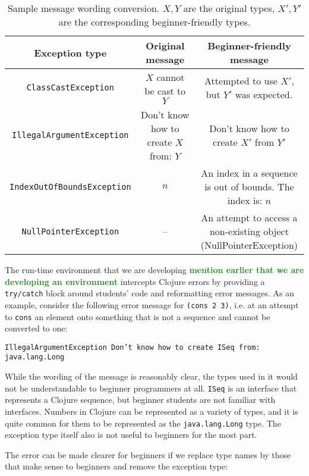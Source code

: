 \documentclass[submission,copyright,creativecommons]{eptcs}
\newcommand{\allcomments}[1]{{#1}}
\newcommand{\elenacomment}[1]{{\bf \textcolor{ForestGreen}{\allcomments{{#1}}}}}
\begin{document}
 \begin{table}
\begin{tabular}{|c|c|c|}
\hline
Exception type & Original message & Beginner-friendly message \\
\hline 
{\tt ClassCastException} & $X$ cannot be cast to $Y$ & {\parbox{5cm}{Attempted to use $X'$, \\ 
but $Y'$ was expected.}} \\[0.3cm]
\hline
{\tt IllegalArgumentException} & 
Don't know how to create $X$ from:  $Y$ & 
{\parbox{5cm}{Don't know how to \\ create  $X'$ from $Y'$}} \\[0.3cm]
\hline
{\tt IndexOutOfBoundsException} & $n$ & {\parbox{5cm}{An index in a sequence \\ 
is out of bounds. The index is: $n$}} \\[0.3cm]
\hline
{\tt NullPointerException} & -- &  {\parbox{5cm}{An attempt to access a 
\\ non-existing object
\\ (NullPointerException)}} \\[0.3cm]
\hline
\end{tabular}
\caption{Sample message wording conversion. $X,Y$ are the original types, $X',Y'$ are the corresponding beginner-friendly types. }\label{table:messages}
\end{table}

The run-time environment that we are developing \elenacomment{mention earlier that we are developing an environment} intercepts Clojure errors by providing a {\tt try/catch} block around students' code and reformatting error messages. 
As an example, consider the following error message for {\tt (cons 2 3)}, i.e. at an attempt to {\tt cons} an element onto something that is not a sequence and cannot be converted to one:

{\tt IllegalArgumentException Don't know how to create ISeq from: java.lang.Long}

While the wording of the message is reasonably clear, the types used in it would not be understandable to beginner programmers at all. {\tt ISeq} is an interface that represents a Clojure sequence, but beginner students are not familiar with interfaces. Numbers in Clojure can be represented as a variety of types, and it is quite common for them to be represented as the {\tt  java.lang.Long} type. The exception type itself also is not useful to beginners for the most part. 

The error can be made clearer for beginners if we replace type names by those that make sense to beginners and remove the exception type:
\end{document}
